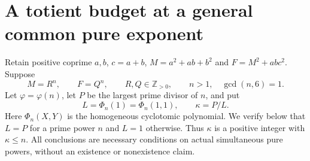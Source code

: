 \section{A totient budget at a general common pure exponent}
\label{sec-euler-progression-compatibility}

Retain positive coprime $a,b$, $c=a+b$, $M=a^2+ab+b^2$ and
$F=M^2+ab c^2$. Suppose
\begin{equation}\label{epg-pure}
 M=R^n,\qquad F=Q^n,\qquad R,Q\in\mathbb Z_{>0},
 \qquad n>1,\quad\gcd(n,6)=1.
\end{equation}
Let $\varphi=\varphi(n)$, let $P$ be the largest prime divisor of
$n$, and put
\begin{equation}\label{epg-kappa}
 L=\Phi_n(1)=\Phi_n(1,1),\qquad \kappa=P/L.
\end{equation}
Here $\Phi_n(X,Y)$ is the homogeneous cyclotomic polynomial.
We verify below that $L=P$ for a prime power $n$ and $L=1$
otherwise. Thus $\kappa$ is a positive integer with $\kappa\le n$.
All conclusions are necessary conditions on actual simultaneous
pure powers, without an existence or nonexistence claim.

